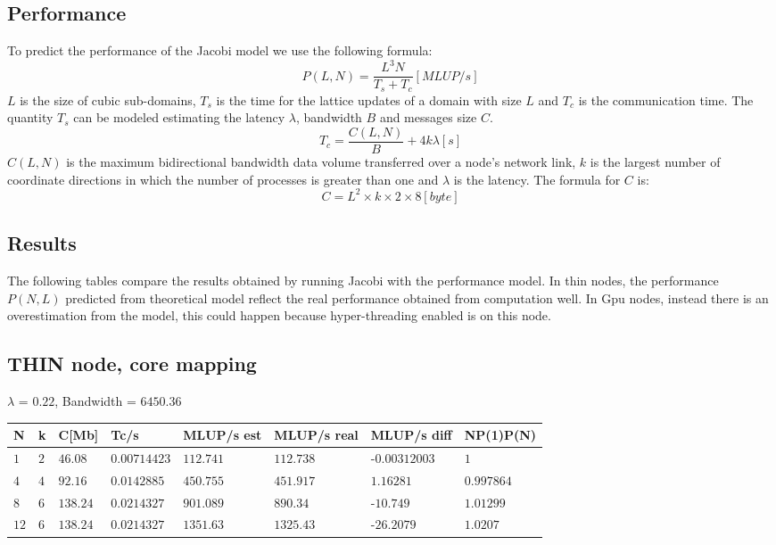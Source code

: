 \documentclass[11pt,a4paper]{article}
\begin{document}
\subsection{Performance}
To predict the performance of the Jacobi model we use the following formula:
\begin{equation}
P(L,N)=\dfrac{L^3 N}{T_s + T_c}[MLUP/s]
\end{equation}
$L$ is the size of cubic sub-domains, $T_s$ is the time for the lattice updates of a domain with size $L$ and $T_c$ is the communication time. The quantity $T_s$ can be modeled estimating the latency $\lambda$, bandwidth $B$ and messages size $C$.
\begin{equation}
T_c = \dfrac{C(L,N)}{B}+4k\lambda[s]
\end{equation}
$C(L,N)$ is the maximum bidirectional bandwidth data volume transferred over a node's network link, $k$ is the largest number of coordinate directions in which the number of processes is greater than one and $\lambda$ is the latency. The formula for $C$ is:
\begin{equation}
C = L^2 \times k \times 2 \times 8[byte]
\end{equation}
\subsection{Results}
The following tables compare the results obtained by running Jacobi with the performance model. In thin nodes, the performance $P(N,L)$ predicted from theoretical model reflect the real performance obtained from computation well. In Gpu nodes, instead there is an overestimation from the model, this could happen because hyper-threading enabled is on this node.
\subsection*{THIN node, core mapping}
$\lambda$ = $0.22$, Bandwidth = $6450.36$
\begin{table}[H]
    \centering
    \begin{tabular}{|l|l|l|l|l|l|l|l|}
    \toprule
    N 		& k 	& C[Mb] 	& Tc/s 			& MLUP/s est 	& MLUP/s real 	& MLUP/s diff  & NP(1)P(N) \\
    \midrule
    $1$ 	& $2$ 	& $46.08$ 	& $0.00714423$ 	& $112.741$ 	& $112.738$ 	&-$0.00312003$ & $1$ \\
    $4$ 	& $4$ 	& $92.16$ 	& $0.0142885$ 	& $450.755$ 	& $451.917$ 	&$1.16281$ & $0.997864$ \\
    $8$ 	& $6$ 	& $138.24$ 	& $0.0214327$ 	& $901.089$ 	& $890.34$ 		&-$10.749$ & $1.01299$ \\
    $12$ 	& $6$ 	& $138.24$ 	& $0.0214327$ 	& $1351.63$ 	& $1325.43$ 	&-$26.2079$ & $1.0207$ \\
    \bottomrule
    \end{tabular}
\end{table}
\end{document}
